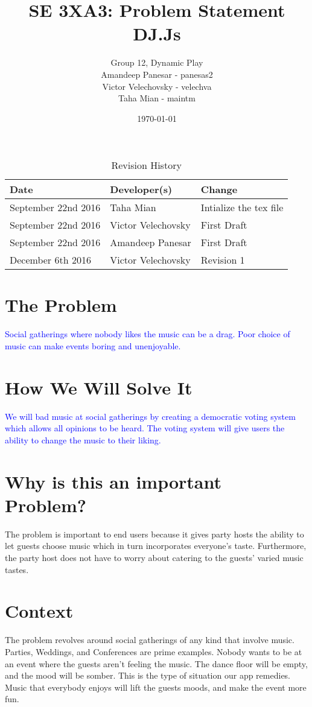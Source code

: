 \documentclass[11pt,fleqn]{article}
\title{SE 3XA3: Problem Statement\\DJ.Js}
\author{Group 12, Dynamic Play\\
Amandeep Panesar - panesas2 \\ Victor Velechovsky - velechva \\ Taha Mian - maintm}
\date{\today}
\begin{document}
\begin{table}[hp]
\caption{Revision History} \label{TblRevisionHistory}
\begin{tabularx}{\textwidth}{llX}
\toprule
\textbf{Date} & \textbf{Developer(s)} & \textbf{Change}\\
\midrule
September 22nd 2016 & Taha Mian & Intialize the tex file\\
September 22nd 2016 & Victor Velechovsky & First Draft\\
September 22nd 2016 & Amandeep Panesar & First Draft\\
December  6th  2016 & Victor Velechovsky & Revision 1\\
\bottomrule
\end{tabularx}
\end{table}
\maketitle

\section{The Problem}

\textcolor{blue}{
Social gatherings where nobody likes the music can be a drag. Poor choice of music can make events boring and unenjoyable.
}

\section{How We Will Solve It}
\textcolor{blue} {
We will bad music at social gatherings by creating a democratic voting system which allows all opinions to be heard. The voting system will give users the ability to change the music to their liking.
}

\section{Why is this an important Problem?}
The problem is important to end users because it gives party hosts the ability
to let guests choose music which in turn incorporates everyone's taste.
Furthermore, the party host does not have to worry about catering to the guests' varied music tastes.

\section{Context}
The problem revolves around social gatherings of any kind that involve music.
Parties, Weddings, and Conferences are prime examples. Nobody wants to be at an
event where the guests aren't feeling the music. The dance floor will be
empty, and the mood will be somber. This is the type of situation our app
remedies. Music that everybody enjoys will lift the guests moods, and make
the event more fun.
\end{document}

